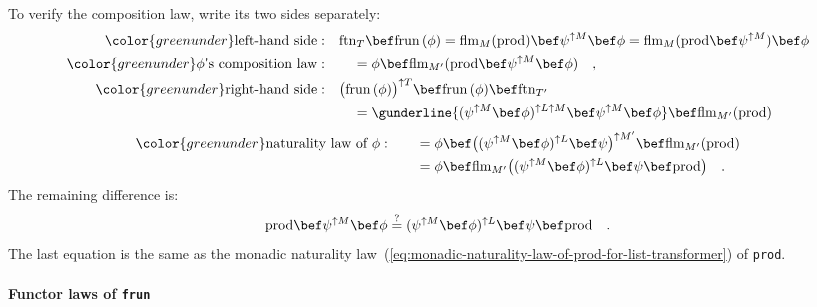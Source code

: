 To verify the composition law, write its two sides separately:
\begin{align*}
{\color{greenunder}\text{left-hand side}:}\quad & \text{ftn}_{T}\bef\text{frun}\,(\phi)=\text{flm}_{M}(\text{prod})\bef\psi^{\uparrow M}\bef\phi=\text{flm}_{M}(\text{prod}\bef\psi^{\uparrow M})\bef\phi\\
{\color{greenunder}\phi\text{\textsf{'}s composition law}:}\quad & \quad=\phi\bef\text{flm}_{M^{\prime}}(\text{prod}\bef\psi^{\uparrow M}\bef\phi)\quad,\\
{\color{greenunder}\text{right-hand side}:}\quad & \big(\text{frun}\,(\phi)\big)^{\uparrow T}\bef\text{frun}\,(\phi)\bef\text{ftn}_{T^{\prime}}\\
 & \quad=\gunderline{(\psi^{\uparrow M}\bef\phi)^{\uparrow L\uparrow M}\bef\psi^{\uparrow M}\bef\phi}\bef\text{flm}_{M^{\prime}}(\text{prod})
\end{align*}
\begin{align*}
{\color{greenunder}\text{naturality law of }\phi:}\quad & \quad=\phi\bef\big((\psi^{\uparrow M}\bef\phi)^{\uparrow L}\bef\psi\big)^{\uparrow M^{\prime}}\bef\text{flm}_{M^{\prime}}(\text{prod})\\
 & \quad=\phi\bef\text{flm}_{M^{\prime}}\big((\psi^{\uparrow M}\bef\phi)^{\uparrow L}\bef\psi\bef\text{prod}\big)\quad.
\end{align*}
The remaining difference is:
\[
\text{prod}\bef\psi^{\uparrow M}\bef\phi\overset{?}{=}(\psi^{\uparrow M}\bef\phi)^{\uparrow L}\bef\psi\bef\text{prod}\quad.
\]
The last equation is the same as the monadic naturality law~(\ref{eq:monadic-naturality-law-of-prod-for-list-transformer})
of \lstinline!prod!.

\paragraph{Functor laws of \texttt{frun}}

